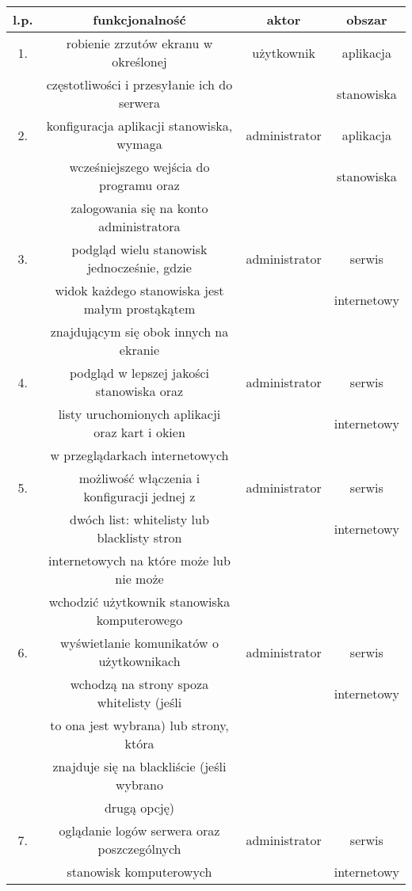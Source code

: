 \begin{tabular}{|c|c|c|c|} \hline
l.p. & funkcjonalność & aktor & obszar \\ \hline

1.  & robienie zrzutów ekranu w określonej          & użytkownik & aplikacja \\
    & częstotliwości i przesyłanie ich do serwera   &            & stanowiska \\ \hline
    
2.  & konfiguracja aplikacji stanowiska, wymaga     & administrator & aplikacja \\
    & wcześniejszego wejścia do programu oraz       &               & stanowiska \\
    & zalogowania się na konto administratora   && \\ \hline
    
3.  & podgląd wielu stanowisk jednocześnie, gdzie    & administrator& serwis \\
    & widok każdego stanowiska jest małym prostąkątem&              & internetowy \\
    & znajdującym się obok innych na ekranie         & & \\ \hline
    
4.  & podgląd w lepszej jakości stanowiska oraz       & administrator & serwis \\
    & listy uruchomionych aplikacji oraz kart i okien & & internetowy \\
    & w przeglądarkach internetowych & & \\ \hline
    
5.  & możliwość włączenia i konfiguracji jednej z    & administrator & serwis \\
    & dwóch list: whitelisty lub blacklisty stron    & & internetowy \\
    & internetowych na które może lub nie może      && \\
    & wchodzić użytkownik stanowiska komputerowego && \\ \hline
    
6. & wyświetlanie komunikatów o użytkownikach   & administrator & serwis \\
    & wchodzą na strony spoza whitelisty (jeśli & & internetowy \\
    & to ona jest wybrana) lub strony, która && \\
    &znajduje się na blackliście (jeśli wybrano && \\
    & drugą opcję) &&\\ \hline
    
7.  & oglądanie logów serwera oraz poszczególnych& administrator & serwis \\
    & stanowisk komputerowych && internetowy \\ \hline
    

\end{tabular}
